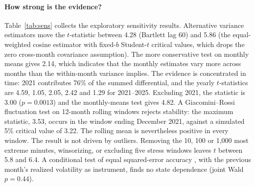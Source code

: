 \documentclass[11pt]{article}
\begin{document}
\paragraph{How strong is the evidence?} Table~\ref{tab:sens} collects the exploratory sensitivity results. Alternative variance estimators move the $t$-statistic between 4.28 (Bartlett lag 60) and 5.86 (the equal-weighted cosine estimator with fixed-$b$ Student-$t$ critical values, which drops the zero cross-month covariance assumption). The more conservative test on monthly means gives 2.14, which indicates that the monthly estimates vary more across months than the within-month variance implies. The evidence is concentrated in time: 2021 contributes 76\% of the summed differential, and the yearly $t$-statistics are 4.59, 1.05, 2.05, 2.42 and 1.29 for 2021--2025. Excluding 2021, the statistic is 3.00 ($p=0.0013$) and the monthly-means test gives 4.82. A Giacomini--Rossi fluctuation test on 12-month rolling windows rejects stability: the maximum statistic, 3.53, occurs in the window ending December 2021, against a simulated 5\% critical value of 3.22. The rolling mean is nevertheless positive in every window. The result is not driven by outliers. Removing the 10, 100 or 1,000 most extreme minutes, winsorizing, or excluding five stress windows leaves $t$ between 5.8 and 6.4. A conditional test of equal squared-error accuracy \citep{giacominiwhite2006}, with the previous month's realized volatility as instrument, finds no state dependence (joint Wald $p=0.44$).
\end{document}
